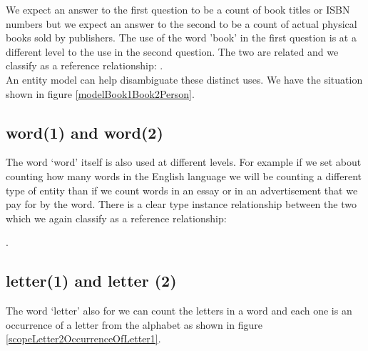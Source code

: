 \noindent We expect an answer to the first question to be a count of book titles or ISBN numbers but we expect an answer to 
the second to be a count of actual physical books sold by publishers. The use of the word 'book' in the first 
question is at a different level to the use in the second question. The two are related and we classify as a reference relationship:
\raisebox{-1.0cm}{}.\\

\noindent An entity model can help disambiguate these distinct uses. 
We have the situation shown in figure \ref{modelBook1Book2Person}. \\



\subsection{word(1) and word(2)}
\noindent The word `word' itself is also used at different levels. For example if we set 
about counting how many words in 
the English language we will be counting a different type of entity than if we count words in an essay or in an advertisement that we pay for by the word.
There is a clear type instance relationship between the two which we again classify as a reference relationship:
 
\raisebox{-1.0cm}{}.\\




\subsection{letter(1) and letter (2)}
\noindent The word `letter' also for we can count the letters in a word and each one is an occurrence of a letter from the alphabet as shown in figure \ref{scopeLetter2OccurrenceOfLetter1}. \\


